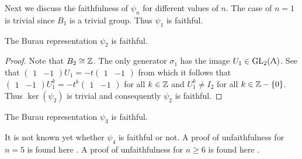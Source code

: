 
Next we discuss the faithfulness of $\psi_n$ for different values of $n$. The case of $n = 1$ is trivial since $B_1$ is a trivial group. Thus $\psi_1$ is faithful.

\begin{proposition}
\label{sec:burau-representation-11}
  The Burau representation $\psi_2$ is faithful.
\end{proposition}

\begin{proof}
\label{sec:burau-representation-12}
  Note that $B_2 \cong \mathbb{Z}$. The only generator $\sigma_1$ has the image $U_1 \in \text{GL}_2(\Uplambda)$. See that $\begin{pmatrix} 1 & -1 \end{pmatrix} U_1 = -t \begin{pmatrix} 1 & -1 \end{pmatrix} $ from which it follows that $\begin{pmatrix} 1 & -1 \end{pmatrix}U_1^k = -t^k \begin{pmatrix} 1 & -1 \end{pmatrix} $ for all $k \in \mathbb{Z}$ and $U_1^k \ne I_2$ for all $k \in \mathbb{Z}-\{0\}$. Thus $\ker(\psi_2)$ is trivial and consequently $\psi_2$ is faithful.
\end{proof}

\begin{theorem}
\label{sec:burau-representation-13}
  The Burau representation $\psi_3$ is faithful.
\end{theorem}

It is not known yet whether $\psi_4$ is faithful or not. A proof of unfaithfulness for $n=5$ is found here \cite{bigelow1999burau}. A proof of unfaithfulness for $n\geq 6$ is found here \cite{long1993burau}.

